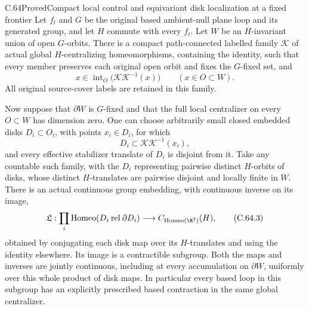 \begin{claim}{C.64}{Proved}{Compact local control and equivariant disk localization at a fixed frontier}
Let $f_t$ and $G$ be the original based ambient-null plane loop and
its generated group, and let $H$ commute with every $f_t$. Let $W$
be an $H$-invariant union of open $G$-orbits. There is a compact
path-connected labelled family $\mathcal K$ of actual global
$H$-centralizing homeomorphisms, containing the identity, such that
every member preserves each original open orbit and fixes the
$G$-fixed set, and
\[
 x\in\operatorname{int}_{O}
       \bigl(\mathcal K\mathcal K^{-1}(x)\bigr)
       \qquad(x\in O\subset W).                         \tag{C.64.1}
\]
All original source-cover labels are retained in this family.

Now suppose that $\partial W$ is $G$-fixed and that the full local
centralizer on every $O\subset W$ has dimension zero. One can
choose arbitrarily small closed embedded disks $D_i\subset O_i$,
with points $x_i\in D_i$, for which
\[
 D_i\subset\mathcal K\mathcal K^{-1}(x_i),               \tag{C.64.2}
\]
and every effective stabilizer translate of $D_i$ is disjoint
from it. Take any countable such family, with the $D_i$
representing pairwise distinct $H$-orbits of disks, whose
distinct $H$-translates are pairwise disjoint and locally
finite in $W$.
There is an actual continuous group embedding, with continuous
inverse on its image,
\[
 \mathfrak L:\prod_i\operatorname{Homeo}(D_i\mathbin{\mathrm{rel}}\partial D_i)
 \longrightarrow
 C_{\operatorname{Homeo}(\R^2)}(H),                       \tag{C.64.3}
\]
obtained by conjugating each disk map over its $H$-translates
and using the identity elsewhere. Its image is a contractible
subgroup. Both the maps and inverses are jointly continuous,
including at every accumulation on $\partial W$, uniformly
over this whole product of disk maps. In particular every
based loop in this subgroup has an explicitly prescribed
based contraction in the same global centralizer.
\end{claim}

